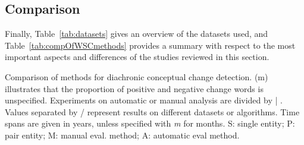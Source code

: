 \documentclass[output=paper]{langsci/langscibook}
\begin{document}
\subsection{Comparison}\label{subs:comparison}

Finally, Table~\ref{tab:datasets} gives an overview of the datasets used, and Table~\ref{tab:compOfWSCmethods} provides a summary with respect to the most important aspects and differences of the studies reviewed in this section. 


\begin{table}
\caption{Comparison of methods for diachronic conceptual change detection. (m) illustrates that the proportion of positive and negative change words is unspecified. Experiments on automatic or manual analysis are divided by | .  Values separated by / represent results on different datasets or algorithms. Time spans are given in years, unless specified with \textit{m} for months. S: single entity; P: pair entity; M: manual eval. method; A: automatic eval method.}\label{tab:compOfWSCmethods}


\end{table}
\end{document}
